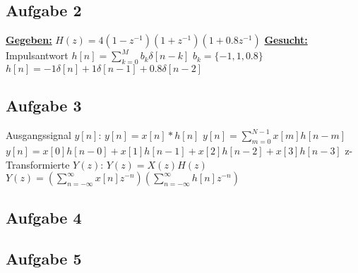 \documentclass[12pt]{scrreprt}
\begin{document}
\subsection*{Aufgabe 2}
\underline{\textbf{Gegeben:}}\newline
\hspace*{5mm}$H(z)=4(1-z^{-1})(1+z^{-1})(1+0.8z^{-1})$\newline
\newline
\underline{\textbf{Gesucht:}}\newline
\hspace*{5mm}Impulsantwort $h[n]=\sum_{k=0}^{M} b_k \delta[n-k]$\newline
\hspace*{5mm}$b_k=\{-1, 1, 0.8\}$\newline
\hspace*{5mm}$h[n]=-1\delta[n]+1\delta[n-1]+0.8\delta[n-2]$

\subsection*{Aufgabe 3}
Ausgangssignal $y[n]$:\newline
$y[n]=x[n]*h[n]$\newline
$y[n]=\sum_{m=0}^{N-1}x[m]h[n-m]$\newline
$y[n]=x[0]h[n-0]+x[1]h[n-1]+x[2]h[n-2]+x[3]h[n-3]$\newline
\newpage
z-Transformierte $Y(z)$:\newline
$Y(z)=X(z)H(z)$\newline
$Y(z)=(\sum_{n=-\infty}^{\infty}x[n]z^{-n})(\sum_{n=-\infty}^{\infty}h[n]z^{-n})$

\subsection*{Aufgabe 4}

\subsection*{Aufgabe 5}
\end{document}
